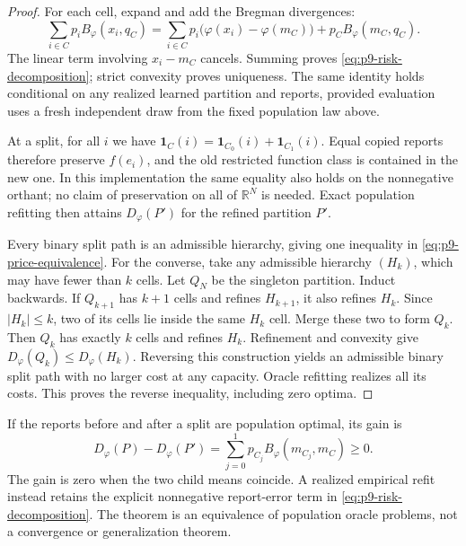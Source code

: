 \begin{proof}
For each cell, expand and add the Bregman divergences:
\[
 \sum_{i\in C}p_iB_\varphi(x_i,q_C)
 =\sum_{i\in C}p_i\bigl(\varphi(x_i)-\varphi(m_C)\bigr)
  +p_CB_\varphi(m_C,q_C).
\]
The linear term involving $x_i-m_C$ cancels. Summing proves
\eqref{eq:p9-risk-decomposition}; strict convexity proves uniqueness.
The same identity holds conditional on any realized learned partition and
reports, provided evaluation uses a fresh independent draw from the fixed
population law above.

At a split, for all $i$ we have
$\mathbf1_C(i)=\mathbf1_{C_0}(i)+\mathbf1_{C_1}(i)$. Equal copied
reports therefore preserve $f(e_i)$, and the old restricted function class
is contained in the new one. In this implementation the same equality
also holds on the nonnegative orthant; no claim of preservation on all of
$\mathbb R^N$ is needed. Exact population refitting then attains
$D_\varphi(P')$ for the refined partition $P'$.

Every binary split path is an admissible hierarchy, giving one inequality
in \eqref{eq:p9-price-equivalence}. For the converse, take any admissible
hierarchy $(H_k)$, which may have fewer than $k$ cells. Let $Q_N$ be the
singleton partition. Induct backwards. If $Q_{k+1}$ has $k+1$ cells and
refines $H_{k+1}$, it also refines $H_k$. Since $|H_k|\le k$, two of its
cells lie inside the same $H_k$ cell. Merge these two to form $Q_k$.
Then $Q_k$ has exactly $k$ cells and refines $H_k$. Refinement and
convexity give $D_\varphi(Q_k)\le D_\varphi(H_k)$. Reversing this
construction yields an admissible binary split path with no larger cost
at any capacity. Oracle refitting realizes all its costs. This proves the
reverse inequality, including zero optima.
\end{proof}

If the reports before and after a split are population optimal, its gain is
\[
 D_\varphi(P)-D_\varphi(P')
 =\sum_{j=0}^1p_{C_j}B_\varphi(m_{C_j},m_C)\ge0.
\]
The gain is zero when the two child means coincide. A realized empirical
refit instead retains the explicit nonnegative report-error term in
\eqref{eq:p9-risk-decomposition}. The theorem is an equivalence of
population oracle problems, not a convergence or generalization theorem.

